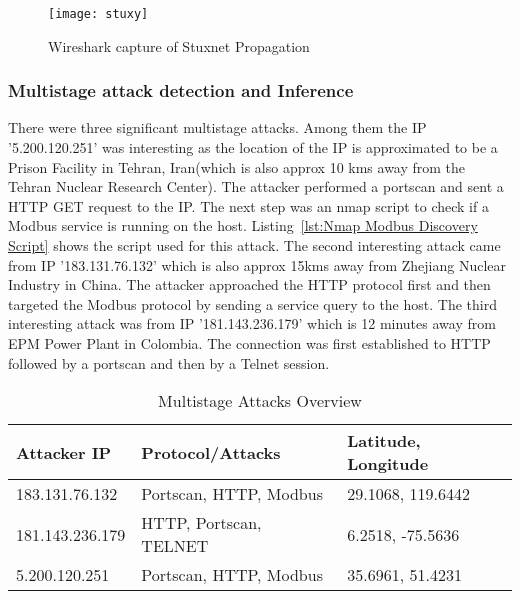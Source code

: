\documentclass[article,msc=informatik,type=msc,colorback,accentcolor=tud9c]{tudthesis}
\begin{document}
	\begin{figure}[H]
		\centering
		\texttt{[image: stuxy]}
		\caption[Wireshark capture of Stuxnet Propagation ]{\label{f:Wireshark capture of Stuxnet Propagation}Wireshark capture of Stuxnet Propagation}
		\end{figure}
	
	
	\subsubsection{Multistage attack detection and Inference}\label{Multistage attack detection and Inference}
	
	There were three significant multistage attacks. Among them the \ac{IP} '5.200.120.251' was interesting as the location of the \ac{IP} is approximated to be a Prison Facility in Tehran, Iran(which is also approx 10 kms away from the Tehran Nuclear Research Center). The attacker performed a portscan and sent a HTTP GET request to the \ac{IP}. The next step was an nmap script to check if a Modbus service is running on the host. Listing~\ref{lst:Nmap Modbus Discovery Script} shows the script used for this attack. The second interesting attack came from \ac{IP} '183.131.76.132' which is also approx 15kms away from Zhejiang Nuclear Industry in China. The attacker approached the HTTP protocol first and then targeted the Modbus protocol by sending a service query to the host. The third interesting attack was from \ac{IP} '181.143.236.179' which is 12 minutes away from EPM Power Plant in Colombia. The connection was first established to HTTP followed by a portscan and then by a Telnet session. 
	
	\begin{table}[H]
	\centering
	\caption{Multistage Attacks Overview}
	\label{Multistage Attacks Overview}
	\begin{tabular}{|l|l|l|}
	\hline
	\textbf{Attacker IP} & \textbf{Protocol/Attacks} & \textbf{Latitude, Longitude} \\ \hline
	183.131.76.132       & Portscan, HTTP, Modbus    & 29.1068, 119.6442            \\ \hline
	181.143.236.179      & HTTP, Portscan, TELNET    & 6.2518, -75.5636             \\ \hline
	5.200.120.251        & Portscan, HTTP, Modbus    & 35.6961, 51.4231             \\ \hline
	\end{tabular}
	\end{table}
	
\end{document}
